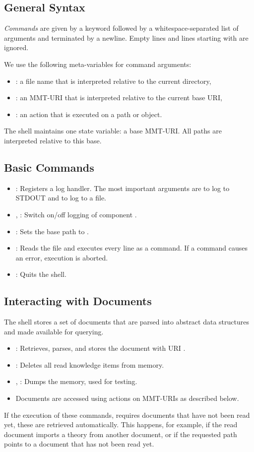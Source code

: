 \subsection{General Syntax}
\emph{Commands} are given by a keyword followed by a whitespace-separated list of arguments and terminated by a newline. Empty lines and lines starting with \code{//} are ignored.

We use the following meta-variables for command arguments:
\begin{itemize}
	\item {}: a file name that is interpreted relative to the current directory,
	\item {}: an MMT-URI that is interpreted relative to the current base URI,
		\item {}: an action that is executed on a path or object.
\end{itemize}
The shell maintains one state variable: a base MMT-URI. All paths are interpreted relative to this base.

\subsection{Basic Commands}\label{sec:shell:basic}
\begin{itemize}
\item {}: Registers a log handler. The most important arguments are  to log to STDOUT and  to log to a file.
\item {}, : Switch on/off logging of component .
\item {}: Sets the base path to .
\item {}: Reads the file  and executes every line as a command. If a command causes an error, execution is aborted.
\item {}: Quits the shell.
\end{itemize}

\subsection{Interacting with Documents}\label{sec:shell:interact}
The shell stores a set of documents that are parsed into abstract data structures and made available for querying.

\begin{itemize}
\item {}: Retrieves, parses, and stores the document with URI .
\item {}: Deletes all read knowledge items from memory.
\item {}, : Dumps the memory, used for testing.
\item Documents are accessed using actions on MMT-URIs as described below.
\end{itemize}
If the execution of these commands, requires documents that have not been read yet, these are retrieved automatically. This happens, for example, if the read document imports a theory from another document, or if the requested path points to a document that has not been read yet.

